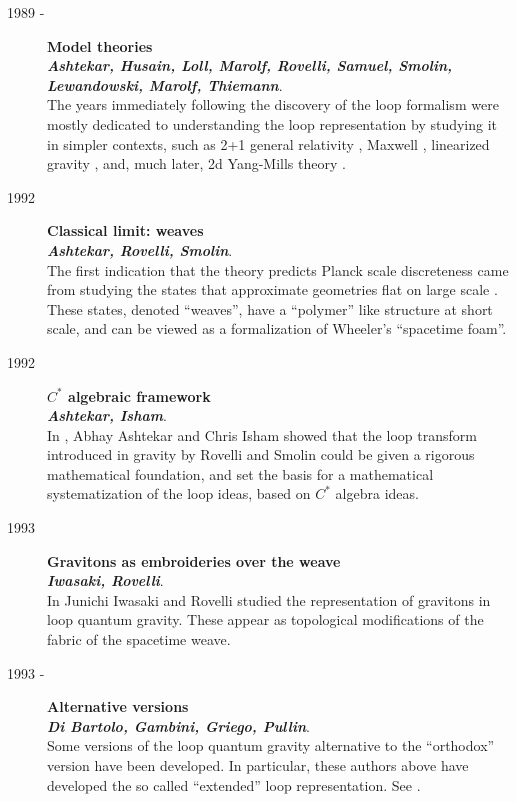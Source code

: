 \documentclass[12pt]{article}
\begin{document}
\begin{description}
	\item[1989 - ] {\bf  Model theories\\
	{\em Ashtekar, Husain, Loll, Marolf, Rovelli, Samuel, Smolin, 
	Lewandowski, Marolf, Thiemann}}.\\
	The years immediately following the discovery of the loop 
	formalism were mostly dedicated to understanding 
	the loop representation by studying it in simpler contexts, 
	such as 2+1 general relativity 
	\cite{AshtekarEtAl89,Marolf93,AshtekarLoll}, Maxwell 
	\cite{AshtekarRovelli}, linearized gravity 
	\cite{AshtekarRovelliSmolin}, and, much later,  
	2d Yang-Mills theory \cite{ALMMT}.

	\item[1992] {\bf  Classical limit: weaves\\
	{\em Ashtekar, Rovelli, Smolin}}.\\
	The first indication that the theory predicts Planck scale 
	discreteness came from studying the states that approximate 
	geometries flat on large scale \cite{weave}.  These states, 
	denoted ``weaves'', have a ``polymer'' like structure at short 
	scale, and can be viewed as a formalization of Wheeler's 
	``spacetime foam''.

    \item[1992] {\bf  $C^{*}$ algebraic framework\\
	{\em Ashtekar, Isham}}.\\
	In \cite{AshtekarIsham}, Abhay Ashtekar and Chris Isham 
	showed that the loop transform introduced in gravity by 
	Rovelli and Smolin could be given a rigorous mathematical 
	foundation, and set the basis for a mathematical 
	systematization of the loop ideas, based on $C^{*}$ algebra 
	ideas.
		
	\item[1993] {\bf  Gravitons as embroideries over the weave\\
	{\em Iwasaki, Rovelli}}.\\
    In \cite{IwasakiRovelli} Junichi Iwasaki and Rovelli studied 
    the representation of gravitons in loop quantum gravity. 
    These appear as topological modifications of the fabric of 
    the spacetime weave. 

	\item[1993 - ] {\bf Alternative versions\\
	{\em Di Bartolo, Gambini, Griego, Pullin}}.\\
    Some versions of the loop quantum gravity alternative to the 
    ``orthodox'' version have been developed. In particular, these  
    authors above have developed the so called ``extended'' loop 
    representation. See \cite{Extended,Extended2}. 


\end{description}
\end{document}
